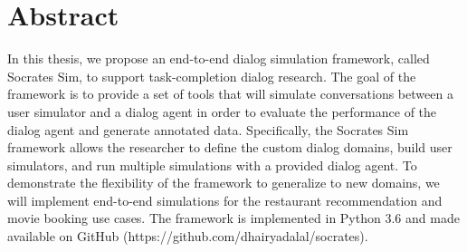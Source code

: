 \chapter*{Abstract}
\thispagestyle{empty}	%

In this thesis, we propose an end-to-end dialog simulation framework, called Socrates Sim, to support task-completion dialog research. The goal of the framework is to provide a set of tools that will simulate conversations between a user simulator and a dialog agent in order to evaluate the performance of the dialog agent and generate annotated data. Specifically, the Socrates Sim framework allows the researcher to define the custom dialog domains, build user simulators, and run multiple simulations with a provided dialog agent. To demonstrate the flexibility of the framework to generalize to new domains, we will implement end-to-end simulations for the restaurant recommendation and movie booking use cases. The framework is implemented in Python 3.6 and made available on GitHub (https://github.com/dhairyadalal/socrates). 

